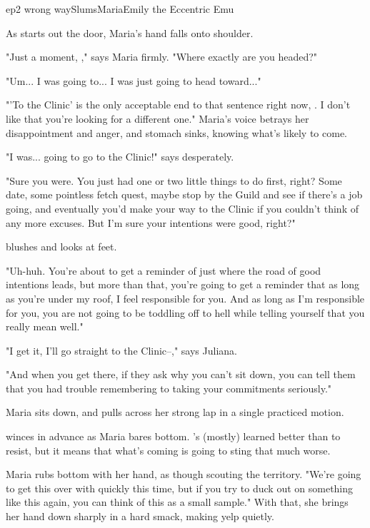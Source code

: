 \documentclass{book}
\begin{document}
\begin{node}{ep2 wrong way}{Slums}{Maria}{Emily the Eccentric Emu}


As \name{} starts out the door, Maria's hand falls onto \hisher{} shoulder.

"Just a moment, \boygirl{}," says Maria firmly. "Where exactly are you headed?"

"Um... I was going to... I was just going to head toward..."

"'To the Clinic' is the only acceptable end to that sentence right now, \nickname{}. I don't like that you're looking for a different one." Maria's voice betrays her disappointment and anger, and \names{} 
stomach sinks, knowing what's likely to come.

"I was... going to go to the Clinic!" says \name{} desperately.

"Sure you were. You just had one or two little things to do first, right? Some date, some pointless fetch quest, maybe stop by the Guild and see if there's a job going, and eventually you'd make your way to the Clinic if you couldn't think of any more 
excuses. But I'm sure your intentions were good, right?"

\name{} blushes and looks at \hisher{} feet. 

"Uh-huh. You're about to get a reminder of just where the road of good intentions leads, but more than that, you're going to get a reminder that as long as you're under my roof, I feel responsible for you. And as long as I'm responsible for you, you are not going to 
be toddling off to hell while telling yourself that you really mean well."

"I get it, I'll go straight to the Clinic--," says Juliana.

"And when you get there, if they ask why you can't sit down, you can tell them that you had trouble remembering to taking your commitments seriously."

Maria sits down, and pulls \name{} across her strong lap in a single practiced motion.

\name{} winces in advance as Maria bares \hisher{} bottom. \HeShe{}'s (mostly) learned better than to resist, but it means that what's coming is going to sting that much worse.

Maria rubs \names{} \bumadj{} bottom with her hand, as though scouting the territory. "We're going to get this over with quickly this time, but if you try to duck out on something like this again, you can think of this as a small sample." With that, she 
brings her hand down sharply in a hard smack, making \name{} yelp quietly.


\end{node}
\end{document}
